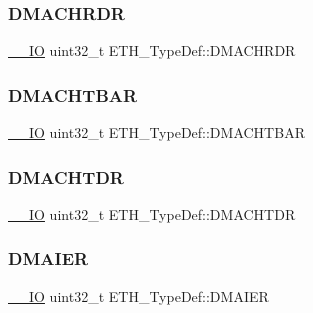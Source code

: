 \mbox{\label{struct_e_t_h___type_def_ab4a222f725cc43952993519b20466637}} 
\subsubsection{\texorpdfstring{DMACHRDR}{DMACHRDR}}
{\footnotesize\ttfamily \mbox{\hyperlink{group___c_m_s_i_s___c_m3__core__definitions_gaec43007d9998a0a0e01faede4133d6be}{\+\_\+\+\_\+\+IO}} uint32\+\_\+t E\+T\+H\+\_\+\+Type\+Def\+::\+D\+M\+A\+C\+H\+R\+DR}

\mbox{\label{struct_e_t_h___type_def_abb2eba5ee2a1621abeeb59e3aadc0318}} 
\subsubsection{\texorpdfstring{DMACHTBAR}{DMACHTBAR}}
{\footnotesize\ttfamily \mbox{\hyperlink{group___c_m_s_i_s___c_m3__core__definitions_gaec43007d9998a0a0e01faede4133d6be}{\+\_\+\+\_\+\+IO}} uint32\+\_\+t E\+T\+H\+\_\+\+Type\+Def\+::\+D\+M\+A\+C\+H\+T\+B\+AR}

\mbox{\label{struct_e_t_h___type_def_ab02310e389320a383022b666af621ba9}} 
\subsubsection{\texorpdfstring{DMACHTDR}{DMACHTDR}}
{\footnotesize\ttfamily \mbox{\hyperlink{group___c_m_s_i_s___c_m3__core__definitions_gaec43007d9998a0a0e01faede4133d6be}{\+\_\+\+\_\+\+IO}} uint32\+\_\+t E\+T\+H\+\_\+\+Type\+Def\+::\+D\+M\+A\+C\+H\+T\+DR}

\mbox{\label{struct_e_t_h___type_def_af35764e78c9cb2a8743822f63134ef42}} 
\subsubsection{\texorpdfstring{DMAIER}{DMAIER}}
{\footnotesize\ttfamily \mbox{\hyperlink{group___c_m_s_i_s___c_m3__core__definitions_gaec43007d9998a0a0e01faede4133d6be}{\+\_\+\+\_\+\+IO}} uint32\+\_\+t E\+T\+H\+\_\+\+Type\+Def\+::\+D\+M\+A\+I\+ER}

